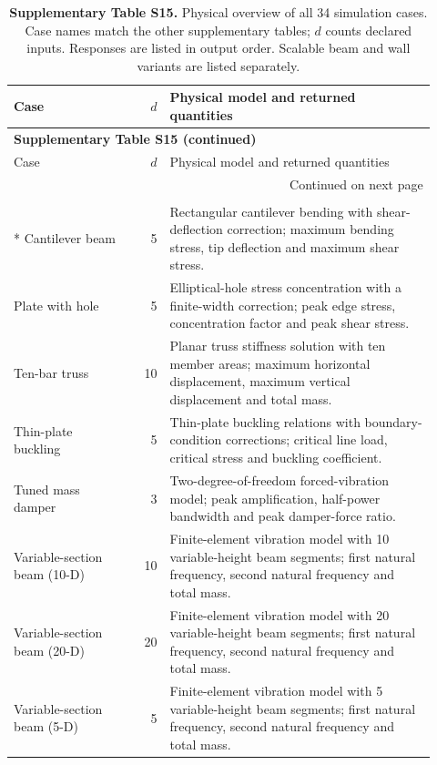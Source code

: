 \begingroup
\SITableFont
\setlength{\tabcolsep}{4pt}
\renewcommand{\arraystretch}{1.12}
\begin{longtable}{@{}p{0.29\linewidth}r p{0.63\linewidth}@{}}
\caption{\textbf{Supplementary Table S15.} Physical overview of all 34 simulation cases. Case names match the other supplementary tables; $d$ counts declared inputs. Responses are listed in output order. Scalable beam and wall variants are listed separately.}\label{tab:case_overview}\\
\toprule Case & $d$ & Physical model and returned quantities \\ \midrule
\endfirsthead
\multicolumn{3}{l}{\normalsize\textbf{Supplementary Table S15 (continued)}}\\
\toprule Case & $d$ & Physical model and returned quantities \\ \midrule
\endhead
\midrule\multicolumn{3}{r}{Continued on next page}\\
\endfoot
\bottomrule
\endlastfoot
\multicolumn{3}{@{}l}{\textbf{Structures}}\\*
Cantilever beam & 5 & Rectangular cantilever bending with shear-deflection correction; maximum bending stress, tip deflection and maximum shear stress. \\
Plate with hole & 5 & Elliptical-hole stress concentration with a finite-width correction; peak edge stress, concentration factor and peak shear stress. \\
Ten-bar truss & 10 & Planar truss stiffness solution with ten member areas; maximum horizontal displacement, maximum vertical displacement and total mass. \\
Thin-plate buckling & 5 & Thin-plate buckling relations with boundary-condition corrections; critical line load, critical stress and buckling coefficient. \\
Tuned mass damper & 3 & Two-degree-of-freedom forced-vibration model; peak amplification, half-power bandwidth and peak damper-force ratio. \\
Variable-section beam (10-D) & 10 & Finite-element vibration model with 10 variable-height beam segments; first natural frequency, second natural frequency and total mass. \\
Variable-section beam (20-D) & 20 & Finite-element vibration model with 20 variable-height beam segments; first natural frequency, second natural frequency and total mass. \\
Variable-section beam (5-D) & 5 & Finite-element vibration model with 5 variable-height beam segments; first natural frequency, second natural frequency and total mass. \\

\end{longtable}
